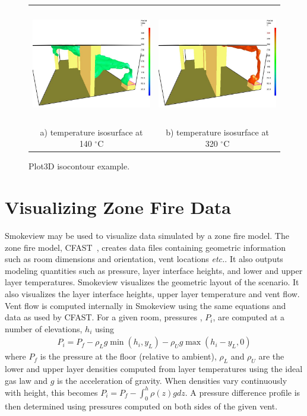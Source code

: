\documentclass[11pt,twoside]{book}
\newcommand{\degC}{$^\circ$C}
\newcommand{\figoptions}{hbp}
\begin{document}
\begin{figure}[\figoptions]
\begin{center}
\begin{tabular}{cc}
\includegraphics[height=2.0in]{figures/roomfire_iso2}
&\includegraphics[height=2.0in]{figures/roomfire_iso1}\\
a) temperature isosurface at 140 \degC&b) temperature
isosurface at 320 \degC
\end{tabular}
\end{center}
\caption{Plot3D isocontour example.}
\label{fig3dcontour}%
\end{figure}

\chapter{Visualizing Zone Fire Data}
Smokeview may be used to visualize data simulated by a zone fire model.
The zone fire model, CFAST~\cite{Jones:2004A}, creates data files containing geometric information such as room dimensions and orientation, vent locations {\em etc.}.  It also outputs modeling quantities such as pressure, layer interface heights, and lower and upper layer temperatures.
Smokeview visualizes the geometric layout of the scenario.  It also visualizes the layer interface heights, upper layer temperature and vent flow.
Vent flow
is computed internally in Smokeview using the same equations and data as used by CFAST.   For a given room, pressures , $P_i$, are computed at a number of elevations, $h_i$ using
\begin{eqnarray*}
P_i=P_f - \rho_L g \min(h_i,y_L) - \rho_U g \max(h_i-y_L,0)
\end{eqnarray*}
where $P_f$ is the pressure at the floor (relative to ambient), $\rho_L$ and $\rho_U$ are the lower and upper layer densities computed from layer temperatures using the ideal gas law and $g$ is the acceleration of gravity.  When densities vary continuously with height, this becomes $P_i=P_f-\int_0^h \rho(z)gdz$.
A pressure difference profile is then determined using pressures computed on both sides of the given vent.
\end{document}
